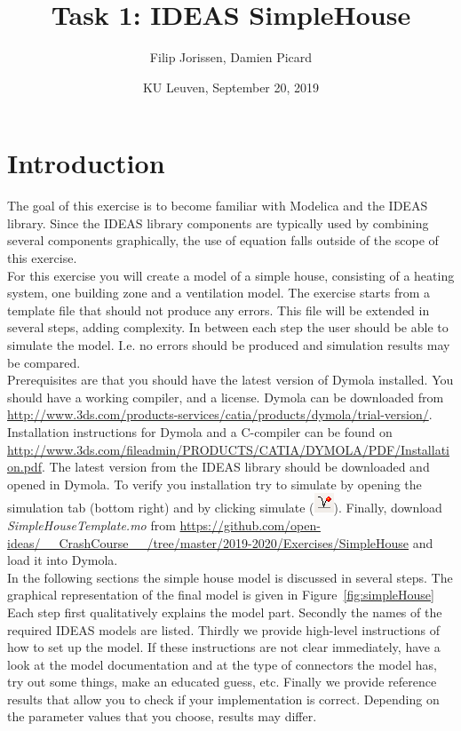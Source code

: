 \documentclass[10pt,a4paper]{article}
\begin{document}
\title{Task 1: IDEAS SimpleHouse}
\author{Filip Jorissen, Damien Picard}
\date{KU Leuven, September 20, 2019}
\maketitle

\section*{Introduction}
The goal of this exercise is to become familiar with 
Modelica and the IDEAS library. 
Since the IDEAS library components are typically used
by combining several components graphically, the use of 
equation falls outside of the scope of this exercise.\\

For this exercise you will create a model of a simple house,
consisting of a heating system, one building zone 
and a ventilation model. 
The exercise starts from a template file that should 
not produce any errors. This file will be extended in
several steps, adding complexity.
In between each step the user should be able to simulate the
model. I.e. no errors should be produced and simulation results 
may be compared.\\

Prerequisites are that you should have the latest version of Dymola
installed. You should have a working compiler, and a license. 
Dymola can be downloaded from 
\url{http://www.3ds.com/products-services/catia/products/dymola/trial-version/}. 
Installation instructions for Dymola and a C-compiler can be found on 
\url{http://www.3ds.com/fileadmin/PRODUCTS/CATIA/DYMOLA/PDF/Installation.pdf}.
The latest version from the IDEAS library should be downloaded and opened in Dymola. 
To verify you installation try to simulate  by opening the simulation tab (bottom right) and by clicking simulate (\includegraphics[scale=0.5]{simulate.png}). Finally, download 
\textit{SimpleHouseTemplate.mo} from \url{https://github.com/open-ideas/__CrashCourse__/tree/master/2019-2020/Exercises/SimpleHouse}
and load it into Dymola.\\

In the following sections the simple house model is discussed 
in several steps. The graphical representation of the final model is 
given in Figure~\ref{fig:simpleHouse}
Each step first qualitatively explains the model part.
Secondly the names of the required IDEAS models 
are listed.
Thirdly we provide high-level instructions of how to
set up the model.
If these instructions are not clear immediately, 
have a look at the model documentation and at the type of
connectors the model has, 
try out some things, 
make an educated guess, etc.
Finally we provide reference results that allow you to check
if your implementation is correct. 
Depending on the parameter values that you choose, results
may differ.
 
\end{document}
